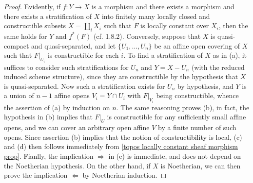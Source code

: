 \begin{proof}
Evidently, if $f:Y\to X$ is a morphism and there exists a morphism and there exists a stratification of $X$ into finitely many locally closed and constructible subsets $X=\coprod_iX_i$ such that $F$ is locally constant over $X_i$, then the same holds for $Y$ and $f^*(F)$ (cf. \cite{EGA4-4} 1.8.2). Conversely, suppose that $X$ is quasi-compact and quasi-separated, and let $\{U_1,\dots,U_n\}$ be an affine open covering of $X$ such that $F|_{U_i}$ is constructible for each $i$. To find a stratification of $X$ as in (a), it suffices to consider such stratifications for $U_n$ and $Y=X-U_n$ (with the reduced induced scheme structure), since they are constructible by the hypothesis that $X$ is quasi-separated. Now such a stratification exists for $U_n$ by hypothesis, and $Y$ is a union of $n-1$ affine opens $V_i=Y\cap U_i$ with $F|_{V_i}$ being constructible, whence the assertion of (a) by induction on $n$. The same reasoning proves (b), in fact, the hypothesis in (b) implies that $F|_U$ is constructible for any sufficiently small affine opens, and we can cover an arbitrary open affine $V$ by a finite number of such opens. Since assertion (b) implies that the notion of constructibility is local, (c) and (d) then follows immediately from \cref{topos locally constant sheaf morphism prop}. Fianlly, the implication $\Rightarrow$ in (e) is immediate, and does not depend on the Noetherian hypothesis. On the other hand, if $X$ is Noetherian, we can then prove the implication $\Leftarrow$ by Noetherian induction.
\end{proof}


